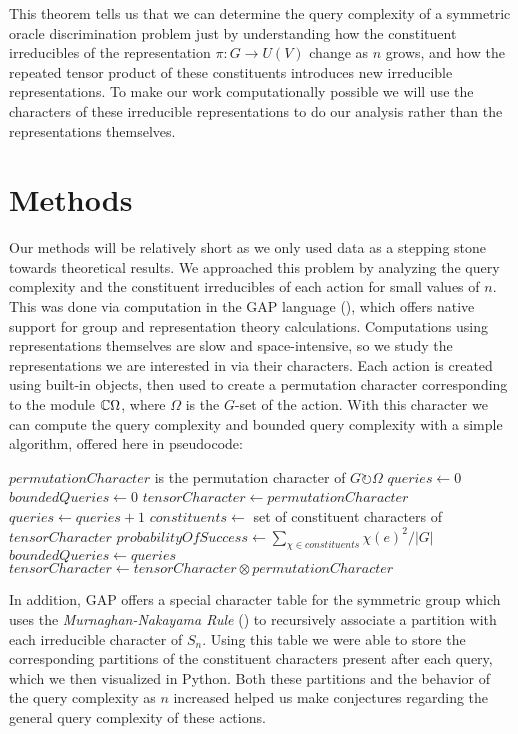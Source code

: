 \documentclass[12pt,twoside]{reedthesis}
\theoremstyle{plain}   %
\theoremstyle{definition}
\theoremstyle{remark}
\numberwithin{equation}{section}
\def\acts{\circlearrowright} %
\begin{document}
  This theorem tells us that we can determine the query complexity of a symmetric oracle discrimination problem just by understanding how the constituent irreducibles of the representation $\pi : G \to U (V)$ change as $n$ grows,
  and how the repeated tensor product of these constituents introduces new irreducible representations.
  To make our work computationally possible we will use the characters of these irreducible representations to do our analysis rather than the representations themselves.
  \chapter{Methods}
  Our methods will be relatively short as we only used data as a stepping stone towards theoretical results.
  We approached this problem by analyzing the query complexity and the constituent irreducibles of each action for small values of $n$.
  This was done via computation in the GAP language (\cite{GAP4}), which offers native support for group and representation theory calculations.
  Computations using representations themselves are slow and space-intensive, so we study the representations we are interested in via their characters.
  Each action is created using built-in objects, then used to create a permutation character corresponding to the module $\mathbb{C} \Omega$, where $\Omega$ is the $G$-set of the action.
  With this character we can compute the query complexity and bounded query complexity with a simple algorithm, offered here in pseudocode:
  \begin{algorithmic}
\Require $permutationCharacter$ is the permutation character of $G \acts \Omega$
\State $queries \gets 0$
\State $boundedQueries \gets 0$
\State $tensorCharacter \gets permutationCharacter$
\Repeat
\State $queries \gets queries + 1$
\State $constituents \gets$ set of constituent characters of $tensorCharacter$
\State $probabilityOfSuccess \gets \sum_{\chi \in constituents} \chi (e)^2 / |G|$
\State $boundedQueries \gets queries$
\EndIf
\State $tensorCharacter \gets tensorCharacter \otimes permutationCharacter$
\EndProcedure
  \end{algorithmic}
  \newpage
  In addition, GAP offers a special character table for the symmetric group which uses the \emph{Murnaghan-Nakayama Rule} (\cite[Chapter 4.10]{sagan}) to recursively associate a partition with each irreducible character of $S_n$.
  Using this table we were able to store the corresponding partitions of the constituent characters present after each query, which we then visualized in Python.
  Both these partitions and the behavior of the query complexity as $n$ increased helped us make conjectures regarding the general query complexity of these actions.
\end{document}
